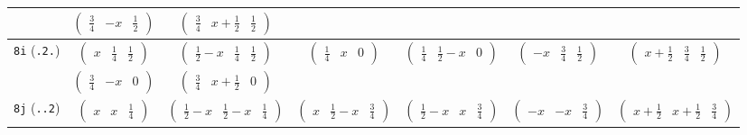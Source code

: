 \documentclass[fleqn,9pt,landscape]{jsarticle}
\begin{document}
\begin{center}
\begin{longtable}{ccccccc}
& $ \begin{pmatrix} \frac{3}{4} & - x & \frac{1}{2} \end{pmatrix} $ & $ \begin{pmatrix} \frac{3}{4} & x + \frac{1}{2} & \frac{1}{2} \end{pmatrix} $ & $  $ & $  $ & $  $ & $  $ \\ \hline
{\tt 8i} ({\tt .2.}) & $ \begin{pmatrix} x & \frac{1}{4} & \frac{1}{2} \end{pmatrix} $ & $ \begin{pmatrix} \frac{1}{2} - x & \frac{1}{4} & \frac{1}{2} \end{pmatrix} $ & $ \begin{pmatrix} \frac{1}{4} & x & 0 \end{pmatrix} $ & $ \begin{pmatrix} \frac{1}{4} & \frac{1}{2} - x & 0 \end{pmatrix} $ & $ \begin{pmatrix} - x & \frac{3}{4} & \frac{1}{2} \end{pmatrix} $ & $ \begin{pmatrix} x + \frac{1}{2} & \frac{3}{4} & \frac{1}{2} \end{pmatrix} $ \\
& $ \begin{pmatrix} \frac{3}{4} & - x & 0 \end{pmatrix} $ & $ \begin{pmatrix} \frac{3}{4} & x + \frac{1}{2} & 0 \end{pmatrix} $ & $  $ & $  $ & $  $ & $  $ \\ \hline
{\tt 8j} ({\tt ..2}) & $ \begin{pmatrix} x & x & \frac{1}{4} \end{pmatrix} $ & $ \begin{pmatrix} \frac{1}{2} - x & \frac{1}{2} - x & \frac{1}{4} \end{pmatrix} $ & $ \begin{pmatrix} x & \frac{1}{2} - x & \frac{3}{4} \end{pmatrix} $ & $ \begin{pmatrix} \frac{1}{2} - x & x & \frac{3}{4} \end{pmatrix} $ & $ \begin{pmatrix} - x & - x & \frac{3}{4} \end{pmatrix} $ & $ \begin{pmatrix} x + \frac{1}{2} & x + \frac{1}{2} & \frac{3}{4} \end{pmatrix} $ \\

\end{longtable}
\end{center}
\end{document}
